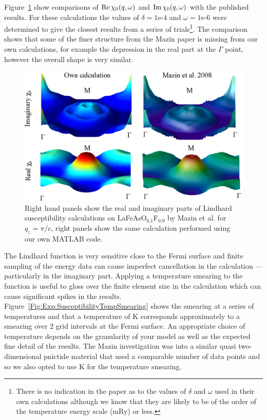 Figure~\ref{Fig:Exp:MazinX0Comparison} show comparisons of $\operatorname{Re} \chi_0(q,\omega)$ and $\operatorname{Im} \chi_0(q,\omega)$ with the published results. For these calculations the values of $\delta=\textrm{1e-4}$ and $\omega=\textrm{1e-6}$ were determined to give the closest results from a series of trials\footnote{There is no indication in the paper as to the values of $\delta$ and $\omega$ used in their own calculations although we know that they are likely to be of the order of the temperature energy scale (\unit[1]{mRy}) or less.}. The comparison shows that some of the finer structure from the Mazin paper is missing from our own calculations, for example the depression in the real part at the $\Gamma$ point, however the overall shape is very similar.

\begin{figure}[htbp]
    \begin{center}
        \includegraphics[scale=0.9]{Chapter-ExperimentalTechnique/Figures/Susceptibility/MazinComparison/MazinComparison}
        \caption{Right hand panels show the real and imaginary parts of Lindhard susceptibility calculations on LaFeAsO$_{0.1}$F$_{0.9}$ by Mazin et al. for $q_z=\pi/c$, right panels show the same calculation performed using our own MATLAB code.}
        \label{Fig:Exp:MazinX0Comparison}
    \end{center}
\end{figure}


The Lindhard function is very sensitive close to the Fermi surface and finite sampling of the energy data  can cause imperfect cancellation in the calculation --- particularly in the imaginary part. Applying a temperature smearing to the function is useful to gloss over the finite element size in the calculation which can cause significant spikes in the results. Figure~\ref{Fig:Exp:SusceptibilityTempSmearing} shows the smearing at a series of temperatures and that a temperature of \unit[158]{K} corresponds approximately to a smearing over 2 grid intervals at the Fermi surface. An appropriate choice of temperature depends on the granularity of your model as well as the expected fine detail of the results. The Mazin investigation was into a similar quasi two-dimensional pnictide material that used a comparable number of data points and so we also opted to use \unit[158]{K} for the temperature smearing.

